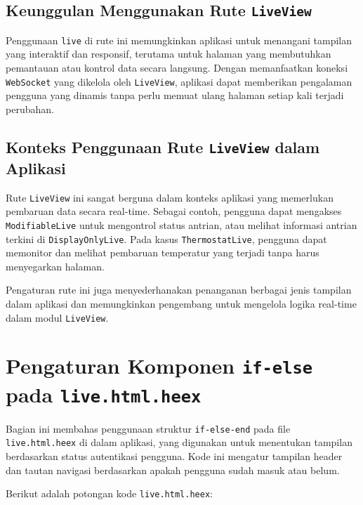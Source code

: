 \subsection{Keunggulan Menggunakan Rute \texttt{LiveView}}
Penggunaan \texttt{live} di rute ini memungkinkan aplikasi untuk menangani tampilan yang interaktif dan responsif, terutama untuk halaman yang membutuhkan pemantauan atau kontrol data secara langsung. Dengan memanfaatkan koneksi \texttt{WebSocket} yang dikelola oleh \texttt{LiveView}, aplikasi dapat memberikan pengalaman pengguna yang dinamis tanpa perlu memuat ulang halaman setiap kali terjadi perubahan.

\subsection{Konteks Penggunaan Rute \texttt{LiveView} dalam Aplikasi}
Rute \texttt{LiveView} ini sangat berguna dalam konteks aplikasi yang memerlukan pembaruan data secara real-time. Sebagai contoh, pengguna dapat mengakses \texttt{ModifiableLive} untuk mengontrol status antrian, atau melihat informasi antrian terkini di \texttt{DisplayOnlyLive}. Pada kasus \texttt{ThermostatLive}, pengguna dapat memonitor dan melihat pembaruan temperatur yang terjadi tanpa harus menyegarkan halaman.

Pengaturan rute ini juga menyederhanakan penanganan berbagai jenis tampilan dalam aplikasi dan memungkinkan pengembang untuk mengelola logika real-time dalam modul \texttt{LiveView}.

\section{Pengaturan Komponen \texttt{if-else} pada \texttt{live.html.heex}}

Bagian ini membahas penggunaan struktur \texttt{if-else-end} pada file \texttt{live.html.heex} di dalam aplikasi, yang digunakan untuk menentukan tampilan berdasarkan status autentikasi pengguna. Kode ini mengatur tampilan header dan tautan navigasi berdasarkan apakah pengguna sudah masuk atau belum. 

Berikut adalah potongan kode \texttt{live.html.heex}:

